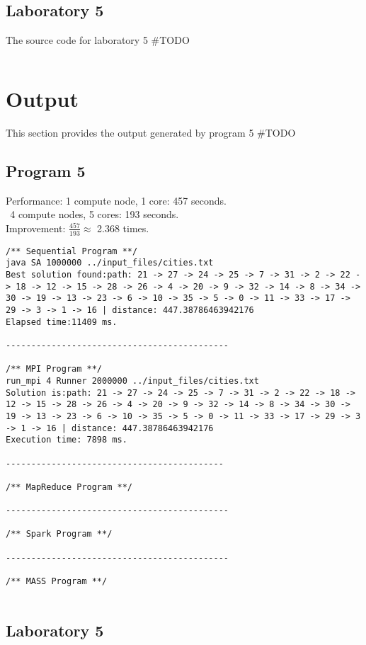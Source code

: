 \documentclass{article}
\begin{document}
		\subsection{Laboratory 5} \label{L5_SRC}
			The source code for laboratory 5 \#TODO\\
			\begin{lstlisting}

			\end{lstlisting}
	
	\section{Output} \label{OUT}
		This section provides the output generated by program 5 \#TODO\\
		
		\subsection{Program 5} \label{P5_OUT}
			Performance: 1 compute node, 1 core: 457 seconds.\\
			\indent\indent\indent\indent $\phantom{:}$4 compute nodes, 5 cores: 193 seconds.\\
			Improvement: $\frac{457}{193} \approx $ 2.368 times.\\
		
			\begin{lstlisting}
/** Sequential Program **/
java SA 1000000 ../input_files/cities.txt
Best solution found:path: 21 -> 27 -> 24 -> 25 -> 7 -> 31 -> 2 -> 22 -> 18 -> 12 -> 15 -> 28 -> 26 -> 4 -> 20 -> 9 -> 32 -> 14 -> 8 -> 34 -> 30 -> 19 -> 13 -> 23 -> 6 -> 10 -> 35 -> 5 -> 0 -> 11 -> 33 -> 17 -> 29 -> 3 -> 1 -> 16 | distance: 447.38786463942176
Elapsed time:11409 ms.

--------------------------------------------

/** MPI Program **/
run_mpi 4 Runner 2000000 ../input_files/cities.txt
Solution is:path: 21 -> 27 -> 24 -> 25 -> 7 -> 31 -> 2 -> 22 -> 18 -> 12 -> 15 -> 28 -> 26 -> 4 -> 20 -> 9 -> 32 -> 14 -> 8 -> 34 -> 30 -> 19 -> 13 -> 23 -> 6 -> 10 -> 35 -> 5 -> 0 -> 11 -> 33 -> 17 -> 29 -> 3 -> 1 -> 16 | distance: 447.38786463942176
Execution time: 7898 ms.

-------------------------------------------

/** MapReduce Program **/

--------------------------------------------

/** Spark Program **/

--------------------------------------------

/** MASS Program **/


			\end{lstlisting}


		\subsection{Laboratory 5}\label{L5_OUT}	
\begin{lstlisting}

\end{lstlisting}


	
	
\end{document}
